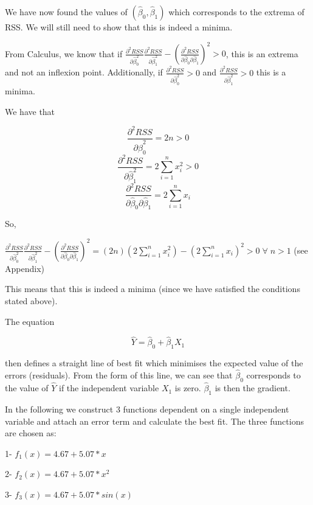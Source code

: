 \documentclass[11pt]{article}
\begin{document}
We have now found the values of \((\hat{\beta}_0,\hat{\beta}_1)\) which
corresponds to the extrema of RSS. We will still need to show that this
is indeed a minima.

From Calculus, we know that if
\(\frac{\partial^2 RSS}{\partial \hat{\beta}_0 ^2} \frac{\partial^2 RSS}{\partial \hat{\beta}_1 ^2} - (\frac{\partial^2 RSS}{\partial \hat{\beta}_0 \partial \hat{\beta}_1})^2 > 0\),
this is an extrema and not an inflexion point. Additionally, if
\(\frac{\partial^2 RSS}{\partial \hat{\beta}_0 ^2} > 0\) and
\(\frac{\partial^2 RSS}{\partial \hat{\beta}_1 ^2} > 0\) this is a
minima.

We have that

\[\frac{\partial^2 RSS}{\partial \hat{\beta}_0 ^2} = 2n > 0\]
\[\frac{\partial^2 RSS}{\partial \hat{\beta}_1 ^2} = 2 \sum_{i=1}^n x_i^2 > 0\]
\[\frac{\partial^2 RSS}{\partial \hat{\beta}_0 \partial \hat{\beta}_1} = 2 \sum_{i=1}^n x_i\]

So,

\(\frac{\partial^2 RSS}{\partial \hat{\beta}_0 ^2} \frac{\partial^2 RSS}{\partial \hat{\beta}_1 ^2} - (\frac{\partial^2 RSS}{\partial \hat{\beta}_0 \partial \hat{\beta}_1})^2 = (2n) (2 \sum_{i=1}^n x_i^2) - (2 \sum_{i=1}^n x_i)^2 > 0 \; \forall \; n>1\)
(see Appendix)

This means that this is indeed a minima (since we have satisfied the
conditions stated above).

The equation

\[\hat{Y} = \hat{\beta}_0 + \hat{\beta}_1 X_1\]

then defines a straight line of best fit which minimises the expected
value of the errors (residuals). From the form of this line, we can see
that \(\hat{\beta}_0\) corresponds to the value of \(\hat{Y}\) if the
independent variable \(X_1\) is zero. \(\hat{\beta}_1\) is then the
gradient.

In the following we construct 3 functions dependent on a single
independent variable and attach an error term and calculate the best
fit. The three functions are chosen as:

1- \(f_1(x) = 4.67 + 5.07*x\)

2- \(f_2(x) = 4.67 + 5.07*x^2\)

3- \(f_3(x) = 4.67 + 5.07*sin(x)\)
\end{document}
